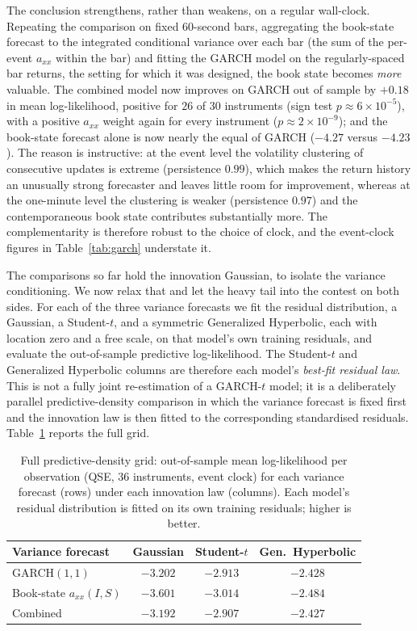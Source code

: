 \documentclass[11pt]{article}
\theoremstyle{plain}
\theoremstyle{definition}
\newcommand{\axx}{a_{xx}}
\begin{document}
The conclusion strengthens, rather than weakens, on a regular wall-clock. Repeating the
comparison on fixed $60$-second bars, aggregating the book-state forecast to the
integrated conditional variance over each bar (the sum of the per-event $\axx$ within
the bar) and fitting the GARCH model on the regularly-spaced bar returns, the setting
for which it was designed, the book state becomes \emph{more} valuable. The combined
model now improves on GARCH out of sample by $+0.18$ in mean log-likelihood, positive
for $26$ of $30$ instruments (sign test $p\approx6\times10^{-5}$), with a positive
$\axx$ weight again for every instrument ($p\approx2\times10^{-9}$); and the book-state
forecast alone is now nearly the equal of GARCH ($-4.27$ versus $-4.23$). The reason is
instructive: at the event level the volatility clustering of consecutive updates is
extreme (persistence $0.99$), which makes the return history an unusually strong
forecaster and leaves little room for improvement, whereas at the one-minute level the
clustering is weaker (persistence $0.97$) and the contemporaneous book state contributes
substantially more. The complementarity is therefore robust to the choice of clock, and
the event-clock figures in Table~\ref{tab:garch} understate it.

The comparisons so far hold the innovation Gaussian, to isolate the variance
conditioning. We now relax that and let the heavy tail into the contest on both sides.
For each of the three variance forecasts we fit the residual distribution, a Gaussian,
a Student-$t$, and a symmetric Generalized Hyperbolic, each with location zero and a free
scale, on that model's own training residuals, and evaluate the out-of-sample predictive
log-likelihood. The Student-$t$ and Generalized Hyperbolic columns are therefore each
model's \emph{best-fit residual law}. This is not a fully joint re-estimation of a
GARCH-$t$ model; it is a deliberately parallel predictive-density comparison in which
the variance forecast is fixed first and the innovation law is then fitted to the
corresponding standardised residuals. Table~\ref{tab:grid} reports the full grid.

\begin{table}[!htbp]
\centering
\caption{Full predictive-density grid: out-of-sample mean log-likelihood per observation
(QSE, $36$ instruments, event clock) for each variance forecast (rows) under each
innovation law (columns). Each model's residual distribution is fitted on its own
training residuals; higher is better.}
\label{tab:grid}
\small
\begin{tabular}{@{}lccc@{}}
\toprule
Variance forecast & Gaussian & Student-$t$ & Gen.\ Hyperbolic \\
\midrule
GARCH$(1,1)$            & $-3.202$ & $-2.913$ & $-2.428$ \\
Book-state $\axx(I,S)$  & $-3.601$ & $-3.014$ & $-2.484$ \\
Combined               & $-3.192$ & $-2.907$ & $\mathbf{-2.427}$ \\
\bottomrule
\end{tabular}
\end{table}
\end{document}
